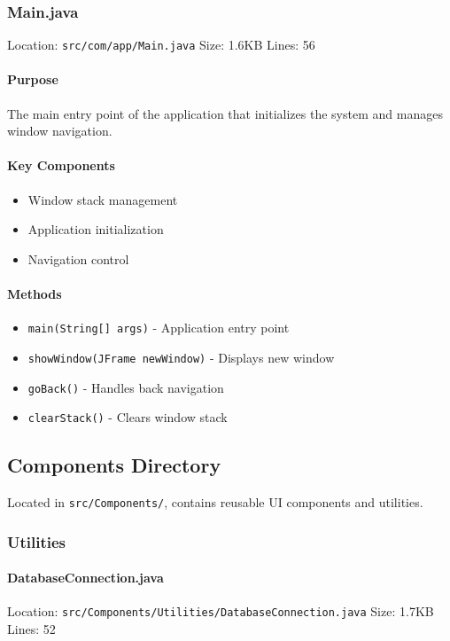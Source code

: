 \documentclass[12pt,a4paper]{article}
\begin{document}
\subsubsection{Main.java}
Location: \texttt{src/com/app/Main.java}
Size: 1.6KB
Lines: 56

\paragraph{Purpose}
The main entry point of the application that initializes the system and manages window navigation.

\paragraph{Key Components}
\begin{itemize}
    \item Window stack management
    \item Application initialization
    \item Navigation control
\end{itemize}

\paragraph{Methods}
\begin{itemize}
    \item \texttt{main(String[] args)} - Application entry point
    \item \texttt{showWindow(JFrame newWindow)} - Displays new window
    \item \texttt{goBack()} - Handles back navigation
    \item \texttt{clearStack()} - Clears window stack
\end{itemize}

\subsection{Components Directory}
Located in \texttt{src/Components/}, contains reusable UI components and utilities.

\subsubsection{Utilities}
\paragraph{DatabaseConnection.java}
Location: \texttt{src/Components/Utilities/DatabaseConnection.java}
Size: 1.7KB
Lines: 52
\end{document}
